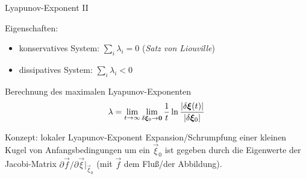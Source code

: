 \begin{frame}{Lyapunov-Exponent II}

  Eigenschaften:
  \begin{itemize}
  \item konservatives System: $\sum_i \lambda_i = 0$ (\emph{Satz von Liouville})
  \item dissipatives System: $\sum_i \lambda_i < 0$
  \end{itemize}

  \begin{exbox}{Berechnung des maximalen Lyapunov-Exponenten}
    \[\lambda = \lim\limits_{t\to\infty}\lim\limits_{\delta{\ensuremath{\boldsymbol{\xi}}}_0 \to {\ensuremath{\boldsymbol{0}}}} \frac{1}{t}\ln\frac{\left\vert \delta{\ensuremath{\boldsymbol{\xi}}}(t) \right\vert}{\left\vert \delta{\ensuremath{\boldsymbol{\xi}}}_0 \right\vert}\]
  \end{exbox}

  \begin{exbox}{Konzept: lokaler Lyapunov-Exponent}
    Expansion/Schrumpfung einer kleinen Kugel von Anfangsbedingungen um ein $\vec\xi_0$
    ist gegeben durch die Eigenwerte der Jacobi-Matrix $\partial\vec f/\partial \vec \xi\vert_{\vec\xi_0}$
    (mit $\vec f$ dem Fluß/der Abbildung).
  \end{exbox}
\end{frame}


